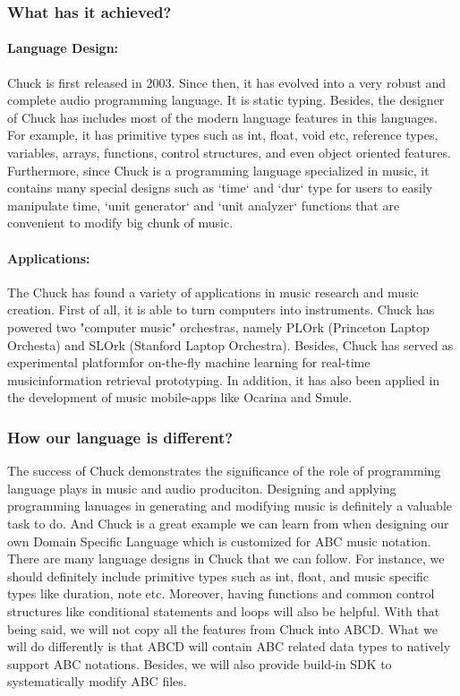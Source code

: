 	\subsubsection{What has it achieved?}
		\paragraph{Language Design:}
			Chuck is first released in 2003\cite{Wang15}. Since then, it has evolved into a very robust and complete audio programming language. It is static typing. Besides, the designer of Chuck has includes most of the modern language features in this languages. For example, it has primitive types such as int, float, void etc, reference types, variables, arrays, functions, control structures, and even object oriented features. Furthermore, since Chuck is a programming language specialized in music, it contains many special designs such as `time` and `dur` type for users to easily manipulate time, `unit generator` and `unit analyzer` functions that are convenient to modify big chunk of music.
		\paragraph{Applications:}
			The Chuck has found a variety of applications in music research and music creation. First of all, it is able to turn computers into instruments. Chuck has powered two "computer music" orchestras, namely PLOrk (Princeton Laptop Orchesta) and SLOrk (Stanford Laptop Orchestra). Besides, Chuck has served as experimental platformfor on-the-fly machine learning for real-time musicinformation retrieval prototyping\cite{Wang15}. In addition, it has also been applied in the development of music mobile-apps like Ocarina and Smule\cite{Wang15}.
	\subsubsection{How our language is different?}
	
		The success of Chuck demonstrates the significance of the role of programming language plays in music and audio produciton. Designing and applying programming lanuages in generating and modifying music is definitely a valuable task to do. And Chuck is a great example we can learn from when designing our own Domain Specific Language which is customized for ABC music notation. There are many language designs in Chuck that we can follow. For instance, we should definitely include primitive types such as int, float, and music specific types like duration, note etc. Moreover, having functions and common control structures like conditional statements and loops will also be helpful. With that being said, we will not copy all the features from Chuck into ABCD. What we will do differently is that ABCD will contain ABC related data types to natively support ABC notations. Besides, we will also provide build-in SDK to systematically modify ABC files. 

